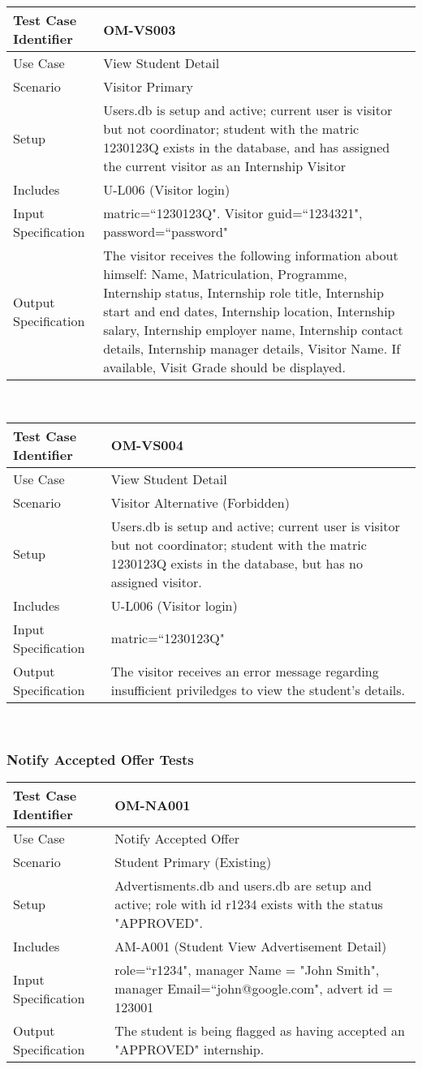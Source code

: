\documentclass{l3deliverable}
\begin{document}
\begin{tabular}{lp{10cm}}
\hline 
\textbf{Test Case Identifier} & OM-VS003\tabularnewline
\hline 
\hline 
Use Case & View Student Detail \tabularnewline
\hline 
Scenario & Visitor Primary \tabularnewline
\hline 
Setup & Users.db is setup and active; current user is visitor but not coordinator; student with the matric 1230123Q exists in the database, and has assigned the current visitor as an Internship Visitor \tabularnewline
\hline 
Includes & U-L006 (Visitor login) \tabularnewline
\hline 
Input Specification & matric=``1230123Q". Visitor guid=``1234321", password=``password" \tabularnewline
\hline 
Output Specification & The visitor receives the following information about himself: Name, Matriculation, Programme, Internship status, Internship role title, Internship start and end dates, Internship location, Internship salary, Internship employer name, Internship contact details, Internship manager details, Visitor Name. If available, Visit Grade should be displayed.\tabularnewline
\hline 
\end{tabular}\\

\begin{tabular}{lp{10cm}}
\hline 
\textbf{Test Case Identifier} & OM-VS004\tabularnewline
\hline 
\hline 
Use Case & View Student Detail \tabularnewline
\hline 
Scenario & Visitor Alternative (Forbidden) \tabularnewline
\hline 
Setup & Users.db is setup and active; current user is visitor but not coordinator; student with the matric 1230123Q exists in the database, but has no assigned visitor. \tabularnewline
\hline 
Includes & U-L006 (Visitor login) \tabularnewline
\hline 
Input Specification & matric=``1230123Q" \tabularnewline
\hline 
Output Specification & The visitor receives an error message regarding insufficient priviledges to view the student's details.\tabularnewline
\hline 
\end{tabular}\\

\subsubsection{Notify Accepted Offer Tests}

\begin{tabular}{lp{10cm}}
\hline 
\textbf{Test Case Identifier} & OM-NA001\tabularnewline
\hline 
\hline 
Use Case & Notify Accepted Offer \tabularnewline
\hline 
Scenario & Student Primary (Existing) \tabularnewline
\hline 
Setup & Advertisments.db and users.db are setup and active; role with id r1234 exists with the status "APPROVED".\tabularnewline
\hline 
Includes & AM-A001 (Student View Advertisement Detail) \tabularnewline
\hline 
Input Specification & role=``r1234", manager Name = "John Smith", manager Email=``john@google.com", advert id = 123001 \tabularnewline
\hline 
Output Specification & The student is being flagged as having accepted an "APPROVED" internship.\tabularnewline
\hline 
\end{tabular}\\
\end{document}

